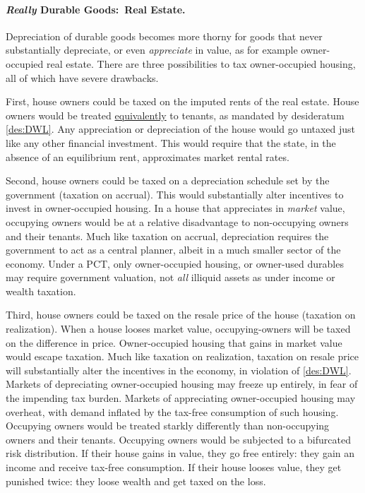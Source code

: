 \paragraph{\emph{Really} Durable Goods:~Real Estate.} Depreciation of durable goods becomes more thorny for goods that never substantially depreciate, or even \emph{appreciate} in value, as for example owner-occupied real estate.
There are three possibilities to tax owner-occupied housing, all of which have severe drawbacks.

First, house owners could be taxed on the imputed rents of the real estate.
House owners would be treated \hyperref[des:DWL]{equivalently} to tenants, as mandated by desideratum \ref{des:DWL}.
Any appreciation or depreciation of the house would go untaxed just like any other financial investment.
This would require that the state, in the absence of an equilibrium rent, approximates market rental rates.

Second, house owners could be taxed on a depreciation schedule set by the government (taxation on accrual).
This would substantially alter incentives to invest in owner-occupied housing.
In a house that appreciates in \emph{market} value, occupying owners would be at a relative disadvantage to non-occupying owners and their tenants.
Much like taxation on accrual, depreciation requires the government to act as a central planner, albeit in a much smaller sector of the economy.
Under a PCT, only owner-occupied housing, or owner-used durables may require government valuation, not \emph{all} illiquid assets as under income or wealth taxation.

Third, house owners could be taxed on the resale price of the house (taxation on realization).
When a house looses market value, occupying-owners will be taxed on the difference in price.
Owner-occupied housing that gains in market value would escape taxation.
Much like taxation on realization, taxation on resale price will substantially alter the incentives in the economy, in violation of \ref{des:DWL}.
Markets of depreciating owner-occupied housing may freeze up entirely, in fear of the impending tax burden.
Markets of appreciating owner-occupied housing may overheat, with demand inflated by the tax-free consumption of such housing.
Occupying owners would be treated starkly differently than non-occupying owners and their tenants.
Occupying owners would be subjected to a bifurcated risk distribution.
If their house gains in value, they go free entirely:
they gain an income and receive tax-free consumption.
If their house looses value, they get punished twice:
they loose wealth and get taxed on the loss.

